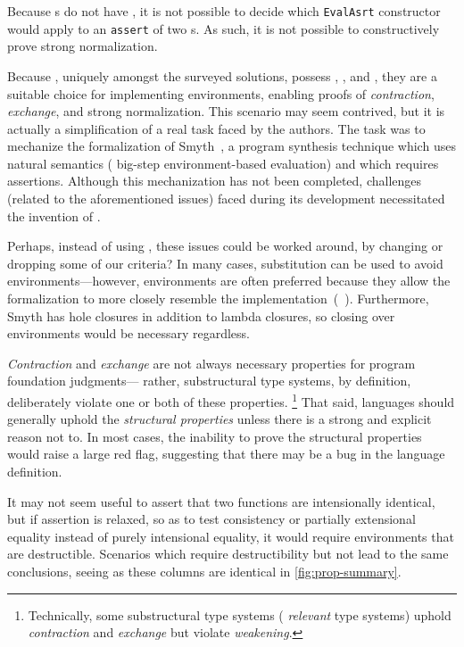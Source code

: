 Because \fpf{}s do not have \EqDec, it is not possible to decide which \texttt{EvalAsrt} constructor would
apply to an \texttt{assert} of two \fpf{}s. As such, it is not possible to constructively prove strong normalization.

Because \dds, uniquely amongst the surveyed solutions, possess \SemTot, \SemInj, and \EqDec,
they are a suitable choice for implementing environments, enabling proofs of \emph{contraction},
\emph{exchange}, and strong normalization.
This scenario may seem contrived, but it is actually a simplification of a real task faced by the authors.
The task was to mechanize the formalization of Smyth~\citep{smyth}, a program synthesis technique which uses
natural semantics (\ie{} big-step environment-based evaluation) and which requires assertions.
Although this mechanization has not been completed, challenges (related to the aforementioned issues)
faced during its development necessitated the invention of \dds.

Perhaps, instead of using \dds, these issues could be worked around, by changing or dropping some of our criteria?
In many cases, substitution can be used to avoid environments---however, environments are often preferred because
they allow the formalization to more closely resemble the implementation~(\eg{}~\citep{Ancona:2014}). Furthermore,
Smyth has hole closures in addition to lambda closures, so closing over environments would be necessary regardless.

\emph{Contraction} and \emph{exchange} are not always necessary properties for program foundation judgments---%
rather, substructural type systems, by definition, deliberately violate one or both of these properties.%
\footnote{\hspace{0.01in}Technically, some substructural type systems (\eg{} \emph{relevant} type systems) uphold \emph{contraction} and \emph{exchange} but violate \emph{weakening}.}
That said, languages should generally uphold the \emph{structural properties} unless there is a strong and explicit
reason not to. In most cases, the inability to prove the structural properties would raise a large red flag,
suggesting that there may be a bug in the language definition.

It may not seem useful to assert that two functions are intensionally identical, but if assertion is relaxed,
so as to test consistency or partially extensional equality instead of purely intensional equality,
it would require environments that are destructible.
Scenarios which require destructibility but not \EqDec{} lead to the same conclusions,
seeing as these columns are identical in \autoref{fig:prop-summary}.

